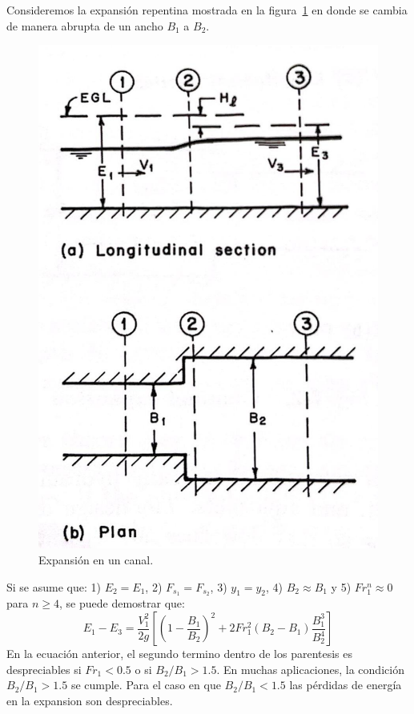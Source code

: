 \documentclass[11pt, oneside]{article}
\begin{document}
Consideremos la expansi\'on repentina mostrada en la figura~\ref{fig73} en donde se cambia de manera abrupta de un ancho $B_1$ a $B_2$.
\begin{figure}[h]
    \centering
    \includegraphics[width=0.8\linewidth]{fig73.jpeg}
    \caption{Expansi\'on en un canal.}
    \label{fig73}
\end{figure}

Si se asume que: 1) $E_2 = E_1$, 2) $F_{s_1} = F_{s_2}$, 3) $y_1 = y_2$, 4) $B_2 \approx B_1$ y 5) $Fr_1^n \approx 0$ para $n \ge 4$, se puede demostrar que:
\begin{equation}
    E_1 - E_3 = \frac{V_1^2}{2g}\left[ \left( 1- \frac{B_1}{B_2}\right)^2 + 2Fr_1^2 \left(B_2 - B_1\right)\frac{B_1^3}{B_2^4}\right]
    \label{eq2}
\end{equation}
En la ecuaci\'on anterior, el segundo termino dentro de los parentesis es despreciables si $Fr_1 < 0.5$ o si $B_2 / B_1 > 1.5$. En muchas aplicaciones, la condici\'on  $B_2 / B_1 > 1.5$ se cumple. Para el caso en que $B_2 / B_1 < 1.5$ las p\'erdidas de energ\'ia en la expansion son despreciables. 
\end{document}
